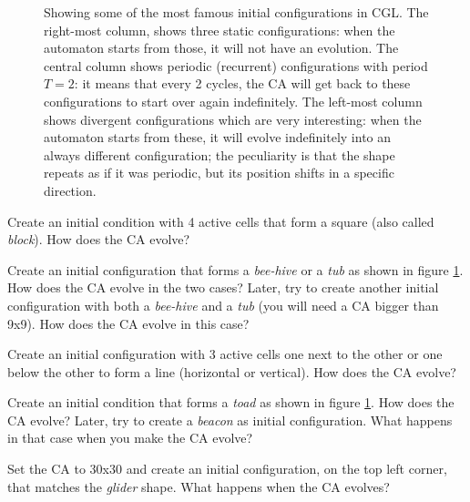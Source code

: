%
\begin{figure}[b]

%
%
\caption[Some of Conway's Game of Life's initial configurations]{Showing
some of the most famous initial configurations in CGL.
The right-most column, shows three static configurations: when the automaton starts from those,
it will not have an evolution.
The central column shows periodic (recurrent) configurations with period $T=2$: it means that every
2 cycles, the CA will get back to these configurations to start over again indefinitely.
The left-most column shows divergent configurations which are very interesting: when the
automaton starts from these, it will evolve indefinitely into an always different configuration; the
peculiarity is that the shape repeats as if it was periodic, but its position shifts in a
specific direction.}
\label{fig:cglplay}
\end{figure}
%

\begin{problem}
\label{prob:cgl1}
Create an initial condition with 4 active cells that form a square (also called \textit{block}).
How does the CA evolve?
\end{problem}

\begin{problem}
\label{prob:cgl2}
Create an initial configuration that forms a \textit{bee-hive} or
a \textit{tub} as shown in figure \ref{fig:cglplay}.
How does the CA evolve in the two cases?
Later, try to create another initial configuration with both a
\textit{bee-hive} and a \textit{tub} (you will need a CA bigger than 9x9).
How does the CA evolve in this case?
\end{problem}

\begin{problem}
\label{prob:cgl3}
Create an initial configuration with 3 active cells one next to the other or one
below the other to form a line (horizontal or vertical).
How does the CA evolve?
\end{problem}

\begin{problem}
\label{prob:cgl4}
Create an initial condition that forms a \textit{toad} as shown in figure \ref{fig:cglplay}.
How does the CA evolve?
Later, try to create a \textit{beacon} as initial configuration. What happens in that
case when you make the CA evolve?
\end{problem}

\begin{problem}
\label{prob:cgl5}
Set the CA to 30x30 and create an initial configuration, on the top left corner, that
matches the \textit{glider} shape. What happens when the CA evolves?
\end{problem}

